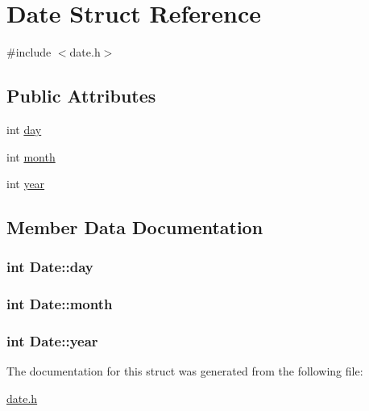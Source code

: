 \hypertarget{structDate}{\section{Date Struct Reference}
\label{structDate}
}


{\ttfamily \#include $<$date.\-h$>$}

\subsection*{Public Attributes}
\begin{DoxyCompactItemize}
\item 
int \hyperlink{structDate_a5b192adcabf2b2871e3f0b76c1ec1601}{day}
\item 
int \hyperlink{structDate_a533843e07c6ac8d19fee9b16f5336ba2}{month}
\item 
int \hyperlink{structDate_a3eeced2ed56bc95d56782b9e738db8ea}{year}
\end{DoxyCompactItemize}


\subsection{Member Data Documentation}
\hypertarget{structDate_a5b192adcabf2b2871e3f0b76c1ec1601}{
\subsubsection[{day}]{\setlength{\rightskip}{0pt plus 5cm}int Date\-::day}}\label{structDate_a5b192adcabf2b2871e3f0b76c1ec1601}
\hypertarget{structDate_a533843e07c6ac8d19fee9b16f5336ba2}{
\subsubsection[{month}]{\setlength{\rightskip}{0pt plus 5cm}int Date\-::month}}\label{structDate_a533843e07c6ac8d19fee9b16f5336ba2}
\hypertarget{structDate_a3eeced2ed56bc95d56782b9e738db8ea}{
\subsubsection[{year}]{\setlength{\rightskip}{0pt plus 5cm}int Date\-::year}}\label{structDate_a3eeced2ed56bc95d56782b9e738db8ea}


The documentation for this struct was generated from the following file\-:\begin{DoxyCompactItemize}
\item 
\hyperlink{date_8h}{date.\-h}\end{DoxyCompactItemize}
